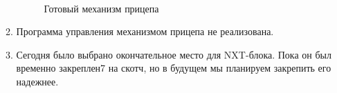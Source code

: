 \begin{enumerate}
\begin{enumerate}
		\begin{figure}[H]
			\begin{minipage}[h]{0.47\linewidth}
			\end{minipage}
			\begin{minipage}[h]{0.47\linewidth}
			\end{minipage}
			\caption{Готовый механизм прицепа}
		\end{figure}
		
		\item Программа управления механизмом прицепа не реализована.\newline
		
		\item Сегодня было выбрано окончательное место для NXT-блока. Пока он был временно закреплен7 на скотч, но в будущем мы планируем закрепить его надежнее.\newline
		

\end{enumerate}
\end{enumerate}

